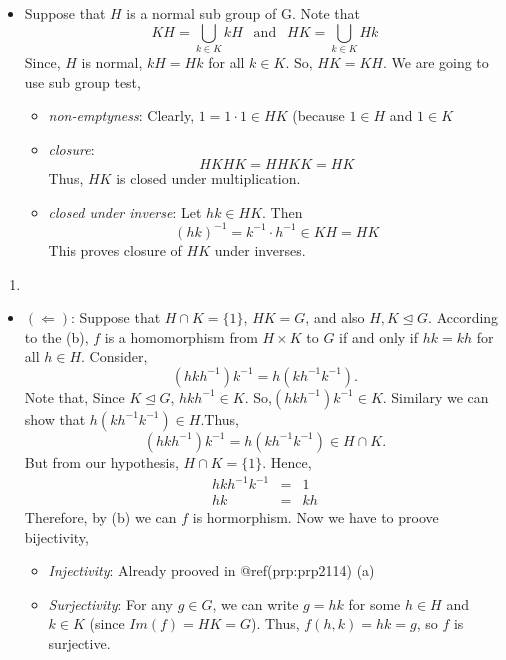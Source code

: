 \documentclass[
]{book}
\providecommand{\tightlist}{%
  \setlength{\itemsep}{0pt}\setlength{\parskip}{0pt}}
\begin{document}
\begin{itemize}
\item
  Suppose that \(H\) is a normal sub group of G. Note that
  \[KH=\bigcup_{k\in K}kH~~\text{   and     } ~~HK=\bigcup_{k\in K}Hk\]
  Since, \(H\) is normal, \(kH=Hk\) for all \(k\in K\). So, \(HK=KH\).
  We are going to use sub group test,

  \begin{itemize}
  \tightlist
  \item
    \emph{non-emptyness}: Clearly, \(1=1\cdot 1\in HK\) (because
    \(1\in H\) and \(1\in K\)
  \item
    \emph{closure}: \[HKHK=HHKK=HK\] Thus, \(HK\) is closed under
    multiplication.
  \item
    \emph{closed under inverse}: Let \(hk\in HK\). Then
    \[(hk)^{-1} = k^{-1}\cdot h^{-1} \in KH=HK \] This proves closure of
    \(HK\) under inverses.
  \end{itemize}
\end{itemize}

\begin{enumerate}
\def\labelenumi{\alph{enumi}.}
\setcounter{enumi}{3}
\tightlist
\item
\end{enumerate}

\begin{itemize}
\tightlist
\item
  \((\Longleftarrow)\): Suppose that \(H \cap K = \{1\}\), \(HK = G\),
  and also \(H,K \trianglelefteq G\). According to the (b), \(f\) is a
  homomorphism from \(H \times K\) to \(G\) if and only if \(hk = kh\)
  for all \(h\in H\). Consider, \[(hkh^{-1})k^{-1}=h(kh^{-1}k^{-1}).\]
  Note that, Since \(K \trianglelefteq G\), \(hkh^{-1}\in K\).
  So,\((hkh^{-1})k^{-1}\in K\). Similary we can show that
  \(h(kh^{-1}k^{-1})\in H\).Thus,\[(hkh^{-1})k^{-1}=h(kh^{-1}k^{-1})\in H\cap K.\]
  But from our hypothesis, \(H\cap K=\{1\}\). Hence, \begin{eqnarray}
  hkh^{-1}k^{-1}&=&1\\
  hk&=& kh
  \end{eqnarray} Therefore, by (b) we can \(f\) is hormorphism. Now we
  have to proove bijectivity,

  \begin{itemize}
  \tightlist
  \item
    \emph{Injectivity}: Already prooved in @ref(prp:prp2114) (a)
  \item
    \emph{Surjectivity}: For any \(g \in G\), we can write \(g = hk\)
    for some \(h \in H\) and \(k \in K\) (since \(Im(f)=HK = G\)). Thus,
    \(f(h, k) = hk = g\), so \(f\) is surjective.
  \end{itemize}
\end{itemize}
\end{document}
